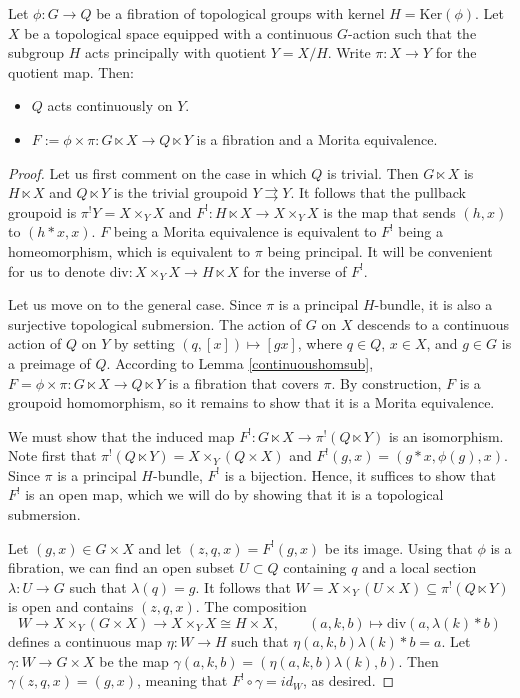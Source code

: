 \documentclass[10pt]{amsart}
\numberwithin{theoremalpha}{section}
\numberwithin{equation}{section}
\numberwithin{definition}{section}
\numberwithin{theorem}{section}
\numberwithin{proposition}{section}
\numberwithin{lemma}{section}
\numberwithin{example}{section}
\numberwithin{remark}{section}
\numberwithin{corollary}{section}
\numberwithin{question}{section}
\numberwithin{problem}{section}
\numberwithin{assumption}{section}
\theoremstyle{named}
\numberwithin{equation}{section}
\begin{document}
\begin{proposition} \label{Moritaequivalencefromquotientprop}
Let $\phi : G \to Q$ be a fibration of topological groups with kernel $H = \mathrm{Ker}(\phi)$. Let $X$ be a topological space equipped with a continuous $G$-action such that the subgroup $H$ acts principally with quotient $Y = X/H$. Write $\pi: X \to Y$ for the quotient map. Then:
\begin{itemize}
    \item $Q$ acts continuously on $Y$.
    \item $F := \phi \times \pi: G \ltimes X \to Q \ltimes Y$ is a fibration and a Morita equivalence.
\end{itemize}
\end{proposition}
\begin{proof}
Let us first comment on the case in which $Q$ is trivial. Then $G \ltimes X$ is $H \ltimes X$ and $Q \ltimes Y$ is the trivial groupoid $Y \rightrightarrows Y$. It follows that the pullback groupoid is $\pi^{!}Y = X \times_Y X$ and $F^{!}: H \ltimes X \rightarrow X \times_Y X$ is the map that sends $(h, x)$ to $(h \ast x, x)$. $F$ being a Morita equivalence is equivalent to $F^{!}$ being a homeomorphism, which is equivalent to $\pi$ being principal. It will be convenient for us to denote $\mathrm{div}: X \times_Y X \rightarrow H \ltimes X$ for the inverse of $F^{!}$.

Let us move on to the general case. Since $\pi$ is a principal $H$-bundle, it is also a surjective topological submersion. The action of $G$ on $X$ descends to a continuous action of $Q$ on $Y$ by setting $(q,[x]) \mapsto [gx]$, where $q \in Q$, $x \in X$, and $g \in G$ is a preimage of $Q$. According to Lemma \ref{continuoushomsub}, $F = \phi \times \pi : G \ltimes X \to Q \ltimes Y$ is a fibration that covers $\pi$. By construction, $F$ is a groupoid homomorphism, so it remains to show that it is a Morita equivalence.

We must show that the induced map $F^{!} : G \ltimes X \to \pi^{!}(Q \ltimes Y)$ is an isomorphism. Note first that $\pi^{!}(Q \ltimes Y) = X \times_{Y} (Q \times X)$ and $F^{!}(g, x) = (g \ast x, \phi(g), x)$. Since $\pi$ is a principal $H$-bundle, $F^{!}$ is a bijection. Hence, it suffices to show that $F^{!}$ is an open map, which we will do by showing that it is a topological submersion. 

Let $(g, x) \in G \times X$ and let $(z, q, x) = F^{!}(g, x)$ be its image. Using that $\phi$ is a fibration, we can find an open subset $U \subset Q$ containing $q$ and a local section $\lambda : U \to G$ such that $\lambda(q) = g$. It follows that $W = X \times_{Y}(U \times X) \subseteq  \pi^{!}(Q \ltimes Y)$ is open and contains $(z, q, x)$. The composition 
\[
W \to X \times_{Y} (G \times X) \to X \times_{Y} X \cong H \times X, \qquad (a, k, b) \mapsto \mathrm{div}(a, \lambda(k) \ast b)
\]
defines a continuous map $\eta: W \to H$ such that $\eta(a,k,b) \lambda(k) \ast b = a$. Let $\gamma: W \to G \times X$ be the map $\gamma(a,k,b) = (\eta(a,k,b)\lambda(k), b)$. Then $\gamma(z,q,x) = (g,x)$, meaning that $F^{!} \circ \gamma = id_{W}$, as desired.
\end{proof}
\end{document}
